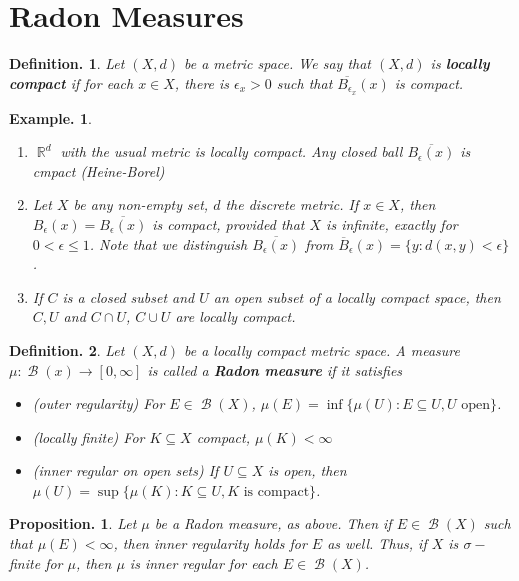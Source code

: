 \documentclass[11pt, a4paper]{memoir}
\DeclareMathOperator{\R}{{\mathbb{R}}}
\theoremstyle{change}
\newtheorem{proposition}[theorem]{Proposition.}
\theoremstyle{plain}
\theoremstyle{nonumberplain}
\newtheorem{definition}{Definition.}
\newtheorem{example}{Example.}
\DeclareMathOperator{\B}{{\mathcal{B}}}
\begin{document}
\section{Radon Measures}
\begin{definition}
    Let $(X,d)$ be a metric space.
    We say that $(X,d)$ is \textbf{locally compact} if for each $x\in X$, there is $\epsilon_x>0$ such that $\overline{B_{\epsilon_x}}(x)$ is compact.
\end{definition}
\begin{example}
    \begin{enumerate}[label=(\roman*)]
        \item $\R^d$ with the usual metric is locally compact.
            Any closed ball $\overline{B_\epsilon(x)}$ is cmpact (Heine-Borel)
        \item Let $X$ be any non-empty set, $d$ the discrete metric.
            If $x\in X$, then $B_\epsilon(x)=\overline{B_\epsilon(x)}$ is compact, provided that $X$ is infinite, exactly for $0<\epsilon\leq 1$.
            Note that we distinguish $\overline{B_{\epsilon}(x)}$ from $\overline{B}_\epsilon(x)=\{y:d(x,y)<\epsilon\}$.
        \item If $C$ is a closed subset and $U$ an open subset of a locally compact space, then $C,U$ and $C\cap U$, $C\cup U$ are locally compact.
    \end{enumerate}
\end{example}
\begin{definition}
    Let $(X,d)$ be a locally compact metric space.
    A measure $\mu:\B(x)\to[0,\infty]$ is called a \textbf{Radon measure} if it satisfies
    \begin{itemize}[nolistsep]
        \item \textit{(outer regularity)} For $E\in\B(X)$, $\mu(E)=\inf\{\mu(U):E\subseteq U, U\text{ open}\}$.
        \item \textit{(locally finite)} For $K\subseteq X$ compact, $\mu(K)<\infty$
        \item \textit{(inner regular on open sets)} If $U\subseteq X$ is open, then $\mu(U)=\sup\{\mu(K):K\subseteq U, K\text{ is compact}\}$.
    \end{itemize}
\end{definition}
\begin{proposition}
    Let $\mu$ be a Radon measure, as above.
    Then if $E\in\B(X)$ such that $\mu(E)<\infty$, then inner regularity holds for $E$ as well.
    Thus, if $X$ is $\sigma-$finite for $\mu$, then $\mu$ is inner regular for each $E\in\B(X)$.
\end{proposition}
\end{document}
